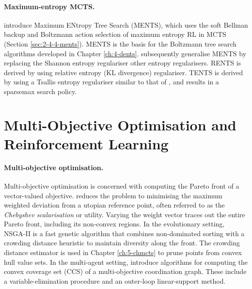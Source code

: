     \paragraph{Maximum-entropy MCTS.}
    \citet{ments} introduce Maximum ENtropy Tree Search (MENTS), which uses the soft Bellman backup and Boltzmann action selection of maximum entropy RL in MCTS (Section \ref{sec:2-4-4-ments}). MENTS is the basis for the Boltzmann tree search algorithms developed in Chapter \ref{ch:4-dents}. \citet{rentsmytents} subsequently generalise MENTS by replacing the Shannon entropy regulariser  other entropy regularisers. RENTS is derived by using relative entropy (KL divergence) regulariser. TENTS is derived by using a Tsallis entropy regulariser similar to that of \citet{tsallis_rl}, and results in a sparsemax search policy.




\section{Multi-Objective Optimisation and Reinforcement Learning}
\label{sec:3-4-morl}

    \paragraph{Multi-objective optimisation.}
    Multi-objective optimisation is concerned with computing the Pareto front of a vector-valued objective. \citet{moo_chebyshev} reduces the problem to minimising the maximum weighted deviation from a utopian reference point, often referred to as the \textit{Chebyshev scalarisation} or utility. Varying the weight vector traces out the entire Pareto front, including its non-convex regions. In the evolutionary setting, NSGA-II \cite{nsga_ii} is a fast genetic algorithm that combines non-dominated sorting with a crowding distance heuristic to maintain diversity along the front. The crowding distance estimator is used in Chapter \ref{ch:5-chmcts} to prune points from convex hull value sets. In the multi-agent setting, \citet{cccs} introduce algorithms for computing the convex coverage set (CCS) of a multi-objective coordination graph. These include a variable-elimination procedure and an outer-loop linear-support method. 

